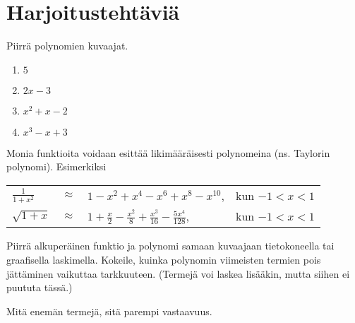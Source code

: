 \section{Harjoitustehtäviä}
\begin{tehtava}
	Piirrä polynomien kuvaajat.
	\begin{enumerate}
		\item $5$
		\item $2x-3$
		\item $x^2+x-2$
		\item $x^3-x+3$
	\end{enumerate}

	\begin{vastaus}
	\end{vastaus}
\end{tehtava}

\begin{tehtava}
	Monia funktioita voidaan esittää likimääräisesti polynomeina (ns. Taylorin polynomi).  	Esimerkiksi
	
	\begin{tabular}{lcll}
	$\frac{1}{1+x^2}$ &$\approx$ & $1-x^2+x^4-x^6+x^8-x^{10}$, & kun $-1<x<1$ \\
	$\sqrt{1+x}$ & $\approx $ & $ 1+\frac{x}{2}
	-\frac{x^2}{8}+\frac{x^3}{16}-\frac{5x^4}{128}$, & kun $-1<x<1$
	\end{tabular}
	
	Piirrä alkuperäinen funktio ja polynomi samaan kuvaajaan tietokoneella tai graafisella laskimella. Kokeile, kuinka polynomin viimeisten termien pois jättäminen vaikuttaa tarkkuuteen. (Termejä voi laskea lisääkin, mutta siihen ei puututa tässä.)

	\begin{vastaus}
		Mitä enemän termejä, sitä parempi vastaavuus.
	\end{vastaus}
\end{tehtava}